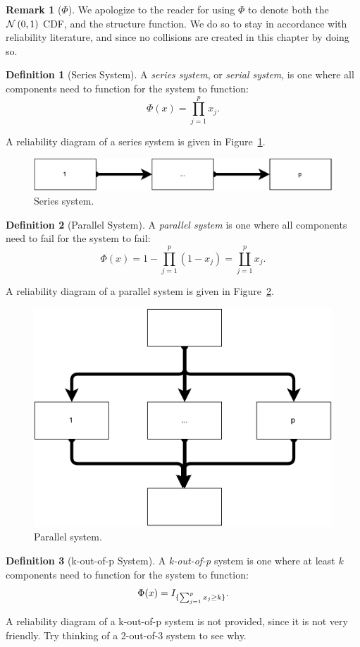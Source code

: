 \documentclass[12pt,a4paper]{report}
\theoremstyle{plain}
\theoremstyle{definition}
\newtheorem{definition}{Definition}
\newtheorem{remark}{Remark}
\newcommand{\struct}{\Phi}
\begin{document}
\begin{remark}[$\Phi$]
We apologize to the reader for using $\Phi$ to denote both the $\mathcal{N}\left(0,1\right)$ CDF, and the structure function.
We do so to stay in accordance with reliability literature, and since no collisions are created in this chapter by doing so.
\end{remark}

\begin{definition}[Series System]
A \emph{series system}, or \emph{serial system}, is one where all components need to function for the system to function: $$\struct(x)=\prod_{j=1}^{p}x_j.$$
\end{definition}
A reliability diagram of a series system is given in Figure~\ref{fig:series_system}.
\begin{figure}[ht]
\centering
\includegraphics[width=0.5\linewidth]{art/series_system}
\caption{Series system.}
\label{fig:series_system}
\end{figure}


\begin{definition}[Parallel System]
A \emph{parallel system} is one where all components need to fail for the system to fail:
$$\struct(x)=1-\prod_{j=1}^{p} (1-x_j)= \coprod_{j=1}^p x_j.$$
\end{definition}
A reliability diagram of a parallel system is given in Figure~\ref{fig:parallel_system}.
\begin{figure}[ht]
\centering
\includegraphics[width=0.5\linewidth]{art/parallel_system}
\caption{Parallel system.}
\label{fig:parallel_system}
\end{figure}





\begin{definition}[k-out-of-p System]
A \emph{k-out-of-p} system is one where at least $k$ components need to function for the system to function:
$$\struct(x)=\indicator{\sum_{j=1}^{p} x_j \geq k}.$$
\end{definition}
A reliability diagram of a k-out-of-p system is not provided, since it is not very friendly. Try thinking of a 2-out-of-3 system to see why.
\end{document}
